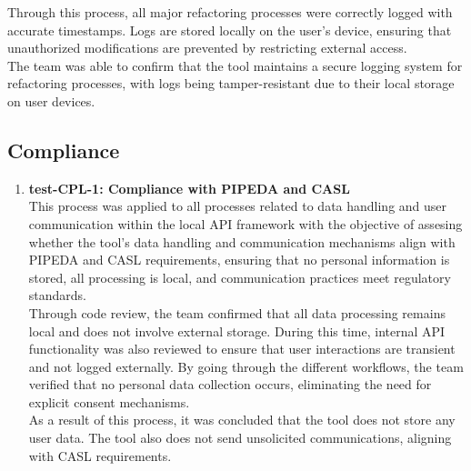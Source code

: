 \documentclass[12pt, titlepage]{article}
\begin{document}
\noindent Through this process, all major refactoring processes were
correctly logged with accurate timestamps. Logs are stored locally on
the user's device, ensuring that unauthorized modifications are
prevented by restricting external access.\\

\noindent The team was able to confirm that the tool maintains a
secure logging system for refactoring processes, with logs being
tamper-resistant due to their local storage on user devices.

\subsection{Compliance}
\begin{enumerate}

  \item \textbf{test-CPL-1: Compliance with PIPEDA and CASL} \\[2mm]
    This process was applied to all processes related to data
    handling and user communication within the local API framework
    with the objective of assesing whether the tool’s data handling
    and communication mechanisms align with PIPEDA and CASL
    requirements, ensuring that no personal information is stored,
    all processing is local, and communication practices meet
    regulatory standards.\\
    \noindent Through code review, the team confirmed that all data
    processing remains local and does not involve external storage.
    During this time, internal API functionality was also reviewed to
    ensure that user interactions are transient and not logged
    externally. By going through the different workflows, the team
    verified that no personal data collection occurs, eliminating the
    need for explicit consent mechanisms.\\
    \noindent As a result of this process, it was concluded that the
    tool does not store any user data. The tool also does not send
    unsolicited communications, aligning with CASL requirements.


\end{enumerate}
\end{document}
